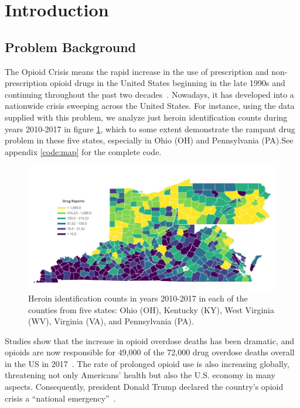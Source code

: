 \documentclass{mcmthesis}
\begin{document}
\maketitle

\tableofcontents

\newpage

\section{Introduction}	
\subsection{Problem Background}
The Opioid Crisis means the rapid increase in the use of prescription and non-prescription opioid drugs in the United States beginning in the late 1990s and continuing throughout the past two decades~\cite{op}. Nowadays, it has developed into a nationwide crisis sweeping across the United States. For instance, using the data supplied with this problem, we analyze just heroin identification counts during years 2010-2017 in figure \ref{situation}, which to some extent demonstrate the rampant drug problem in these five states, especially in Ohio (OH) and Pennsylvania (PA).See appendix \ref{code:map} for the complete code. 

\begin{figure}[htbp]
	\centering 
	\includegraphics[width=1\linewidth]{../figure/test.png}  
	\caption{Heroin identification counts in years 2010-2017 in each of the counties from five states: Ohio (OH), Kentucky (KY), West Virginia (WV), Virginia (VA), and Pennsylvania (PA).} 
	\label{situation}  
\end{figure}

Studies show that the increase in opioid overdose deaths has been dramatic, and opioids are now responsible for 49,000 of the 72,000 drug overdose deaths overall in the US in 2017~\cite{NIH}. The rate of prolonged opioid use is also increasing globally, threatening not only Americans' health but also the U.S. economy in many aspects. Consequently, president Donald Trump declared the country's opioid crisis a ``national emergency''~\cite{Trump}.
\end{document}

